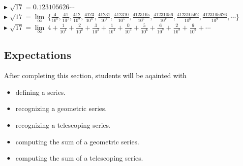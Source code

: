 \documentclass{ximera}
\begin{document}
$\blacktriangleright$  $\sqrt{17} = 0.123105626\cdots$ \\



$\blacktriangleright$ $\sqrt{17} =  \lim\limits_{\infty} \, \{ \frac{4}{10^0}, \frac{41}{10^1},  \frac{412}{10^2}, \frac{4123}{10^3}, \frac{41231}{10^4}, \frac{412310}{10^5}, \frac{4123105}{10^6}, \frac{41231056}{10^7}, \frac{412310562}{10^8}, \frac{4123105626}{10^9}, \cdots \}$ \\



$\blacktriangleright$ $\sqrt{17} = \lim\limits_{\infty} \, 4 + \frac{1}{10^1} + \frac{2}{10^2} + \frac{3}{10^3} + \frac{1}{10^4} + \frac{0}{10^5} + \frac{5}{10^6} + \frac{6}{10^7} + \frac{2}{10^8} + \frac{6}{10^9} + \cdots$ \\











\subsection{Expectations}








\begin{sectionOutcomes}

After completing this section, students will be aqainted with

\begin{itemize}
\item defining a series.
\item recognizing a geometric series.
\item recognizing a telescoping series.
\item computing the sum of a geometric series.
\item computing the sum of a telescoping series.
\end{itemize}

\end{sectionOutcomes}
\end{document}
